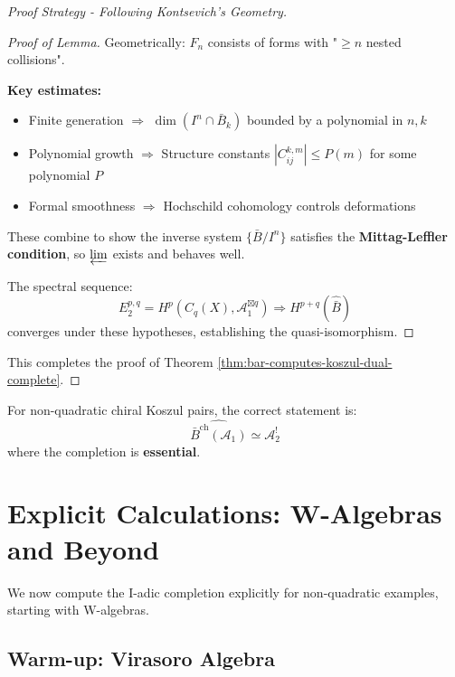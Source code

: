 \begin{proof}[Proof Strategy - Following Kontsevich's Geometry]
\begin{proof}[Proof of Lemma]
Geometrically: $F_n$ consists of forms with "$\geq n$ nested collisions".

\textbf{Key estimates:}
\begin{itemize}
\item Finite generation $\Rightarrow$ $\dim(I^n \cap \bar{B}_k)$ bounded by a polynomial in $n,k$
\item Polynomial growth $\Rightarrow$ Structure constants $|C_{ij}^{k,m}| \leq P(m)$ for some polynomial $P$
\item Formal smoothness $\Rightarrow$ Hochschild cohomology controls deformations
\end{itemize}

These combine to show the inverse system $\{\bar{B}/I^n\}$ satisfies the \textbf{Mittag-Leffler condition}, so $\varprojlim$ exists and behaves well.

The spectral sequence:
$$E_2^{p,q} = H^p(C_q(X), \mathcal{A}_1^{\boxtimes q}) \Rightarrow H^{p+q}(\widehat{\bar{B}})$$
converges under these hypotheses, establishing the quasi-isomorphism.
\end{proof}

This completes the proof of Theorem \ref{thm:bar-computes-koszul-dual-complete}.
\end{proof}

\begin{corollary}
For non-quadratic chiral Koszul pairs, the correct statement is:
$$\boxed{\widehat{\bar{B}^{\text{ch}}(\mathcal{A}_1)} \simeq \mathcal{A}_2^!}$$
where the completion is \textbf{essential}.
\end{corollary}


\section{Explicit Calculations: W-Algebras and Beyond}
\label{sec:w-algebras-explicit-completion}

We now compute the I-adic completion explicitly for non-quadratic examples, starting with W-algebras.


\subsection{Warm-up: Virasoro Algebra}

